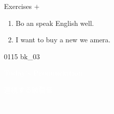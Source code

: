 \documentclass[aspectratio=169,xcolor={dvipsnames,table}]{beamer}
\begin{document}
\begin{frame}[plain]{Exercises  $+$ }
  \Large
  \begin{enumerate}
    \item<2-> Bo  an speak English well.
    \item<4-> I want to buy a new we  amera.
  \end{enumerate}


  \hfill{\tiny 0115}\,{\scriptsize {}\,bk\_03}

\end{frame}
\begin{frame}
  \hypertarget{today}{}
  \centering
  \textcolor{white}{\Huge\bfseries Today's Pronunciation}

  \vspace{30pt}

  \textcolor{white}{\Large 連続する破裂音}

  \textcolor{white}{\Large {} $+$ }
\end{frame}
\end{document}
